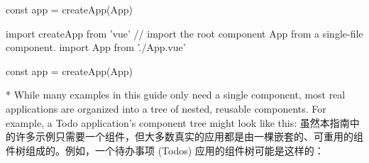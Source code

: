 \begin{paracol}{2}
\begin{codeJs}
const app = createApp(App)
\end{codeJs}
\switchcolumn
\begin{codeJs}
import { createApp } from 'vue'
// import the root component App from a single-file component.
import App from './App.vue'

const app = createApp(App)
\end{codeJs}
\switchcolumn[0]*%
While many examples in this guide only need a single component, most
real applications are organized into a tree of nested, reusable
components. For example, a Todo application's component tree might look
like this:
\switchcolumn
虽然本指南中的许多示例只需要一个组件，但大多数真实的应用都是由一棵嵌套的、可重用的组件树组成的。例如，一个待办事项
(Todos) 应用的组件树可能是这样的：

\end{paracol}
